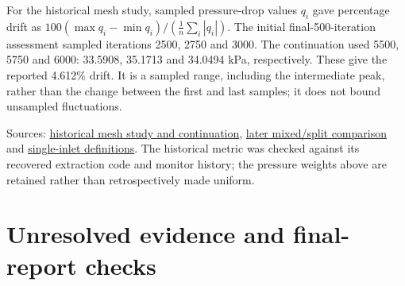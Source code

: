 For the historical mesh study, sampled pressure-drop values \(q_i\) gave percentage drift as \(100(\max q_i-\min q_i)/(\frac{1}{n}\sum_i|q_i|)\). The initial final-500-iteration assessment sampled iterations 2500, 2750 and 3000. The continuation used 5500, 5750 and 6000: 33.5908, 35.1713 and 34.0494 kPa, respectively. These give the reported 4.612\% drift. It is a sampled range, including the intermediate peak, rather than the change between the first and last samples; it does not bound unsampled fluctuations.

Sources: \href{../../../../experiments/phase-02-parity-reset-and-pre-v2-qualification/purnanto-08b-parity-split-inlet/mesh-convergence-checkpoint-20260803.md}{historical mesh study and continuation}, \href{../../../../experiments/phase-08-storyline-reconstruction/stage-01-60k-storyline/results.md}{later mixed/split comparison} and \href{../../../../experiments/phase-10-single-inlet-mesh-convergence/setup.md}{single-inlet definitions}. The historical metric was checked against its recovered extraction code and monitor history; the pressure weights above are retained rather than retrospectively made uniform.

\section{Unresolved evidence and final-report checks}

